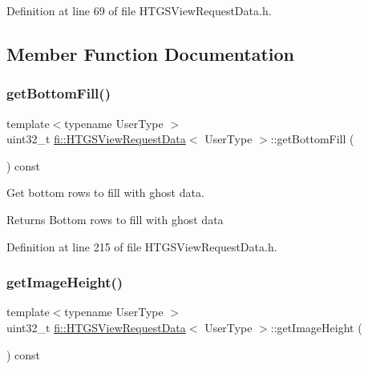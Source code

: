 Definition at line 69 of file H\+T\+G\+S\+View\+Request\+Data.\+h.



\subsection{Member Function Documentation}
\mbox{\label{classfi_1_1HTGSViewRequestData_a1024caaff4a946af5666bf2a36e77994}} 
\subsubsection{\texorpdfstring{get\+Bottom\+Fill()}{getBottomFill()}}
{\footnotesize\ttfamily template$<$typename User\+Type $>$ \\
uint32\+\_\+t \hyperlink{classfi_1_1HTGSViewRequestData}{fi\+::\+H\+T\+G\+S\+View\+Request\+Data}$<$ User\+Type $>$\+::get\+Bottom\+Fill (\begin{DoxyParamCaption}{ }\end{DoxyParamCaption}) const\hspace{0.3cm}{\ttfamily [inline]}}



Get bottom rows to fill with ghost data. 

\begin{DoxyReturn}{Returns}
Bottom rows to fill with ghost data 
\end{DoxyReturn}


Definition at line 215 of file H\+T\+G\+S\+View\+Request\+Data.\+h.

\mbox{\label{classfi_1_1HTGSViewRequestData_acd6239aeaad186d7a27986ca0fa749b7}} 
\subsubsection{\texorpdfstring{get\+Image\+Height()}{getImageHeight()}}
{\footnotesize\ttfamily template$<$typename User\+Type $>$ \\
uint32\+\_\+t \hyperlink{classfi_1_1HTGSViewRequestData}{fi\+::\+H\+T\+G\+S\+View\+Request\+Data}$<$ User\+Type $>$\+::get\+Image\+Height (\begin{DoxyParamCaption}{ }\end{DoxyParamCaption}) const\hspace{0.3cm}{\ttfamily [inline]}}




